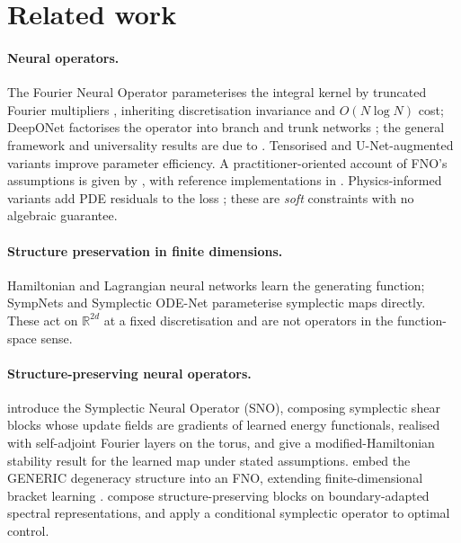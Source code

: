 \documentclass[11pt]{article}
\theoremstyle{definition}
\theoremstyle{remark}
\newcommand{\R}{\mathbb{R}}
\begin{document}
\section{Related work}

\paragraph{Neural operators.} The Fourier Neural Operator parameterises the
integral kernel by truncated Fourier multipliers \citep{li2021fno}, inheriting
discretisation invariance and $O(N\log N)$ cost; DeepONet factorises the operator
into branch and trunk networks \citep{lu2021deeponet}; the general framework and
universality results are due to \citet{kovachki2023neural}. Tensorised
\citep{kossaifi2023mgtfno} and U-Net-augmented \citep{wen2022ufno} variants
improve parameter efficiency. A practitioner-oriented account of FNO's
assumptions is given by \citet{duruisseaux2025fnoexplained}, with reference
implementations in \citet{kossaifi2024library}. Physics-informed variants add PDE
residuals to the loss \citep{raissi2019pinn,li2024pino}; these are \emph{soft}
constraints with no algebraic guarantee.

\paragraph{Structure preservation in finite dimensions.} Hamiltonian
\citep{greydanus2019hnn} and Lagrangian \citep{cranmer2020lnn} neural networks
learn the generating function; SympNets \citep{jin2020sympnets} and Symplectic
ODE-Net \citep{zhong2020symoden} parameterise symplectic maps directly. These act
on $\R^{2d}$ at a fixed discretisation and are not operators in the
function-space sense.

\paragraph{Structure-preserving neural operators.} \citet{makara2026sno}
introduce the Symplectic Neural Operator (SNO), composing symplectic shear blocks
whose update fields are gradients of learned energy functionals, realised with
self-adjoint Fourier layers on the torus, and give a modified-Hamiltonian
stability result for the learned map under stated assumptions. \citet{sulskis2026generic} embed the
GENERIC degeneracy structure \citep{grmela1997generic,ottinger2005beyond} into an
FNO, extending finite-dimensional bracket learning \citep{zhang2022gfinns}.
\citet{zhang2026legonet} compose structure-preserving blocks on boundary-adapted
spectral representations, and \citet{varghese2026pisonet} apply a conditional
symplectic operator to optimal control.
\end{document}
